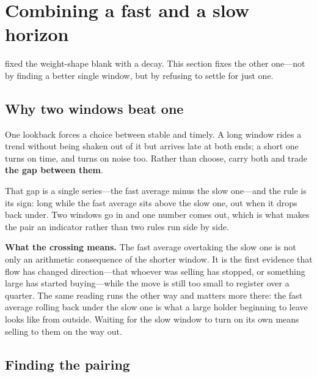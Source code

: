 \section{Combining a fast and a slow horizon}\label{sec:fast-slow}

 fixed the weight-shape blank with a decay. This section fixes the other one---not
by finding a better single window, but by refusing to settle for just one.

\subsection{Why two windows beat one}\label{sec:two-windows}

One lookback forces a choice between stable and timely. A long window rides a trend without being
shaken out of it but arrives late at both ends; a short one turns on time, and turns on noise too.
Rather than choose, carry both and trade \textbf{the gap between them}.

That gap is a single series---the fast average minus the slow one---and the rule is its sign: long
while the fast average sits above the slow one, out when it drops back under. Two windows go in and
one number comes out, which is what makes the pair an indicator rather than two rules run side by
side.


\textbf{What the crossing means.} The fast average overtaking the slow one is not only an arithmetic
consequence of the shorter window. It is the first evidence that flow has changed direction---that
whoever was selling has stopped, or something large has started buying---while the move is still too
small to register over a quarter. The same reading runs the other way and matters more there: the
fast average rolling back under the slow one is what a large holder beginning to leave looks like
from outside. Waiting for the slow window to turn on its own means selling to them on the way out.

\subsection{Finding the pairing}\label{sec:pairing}

